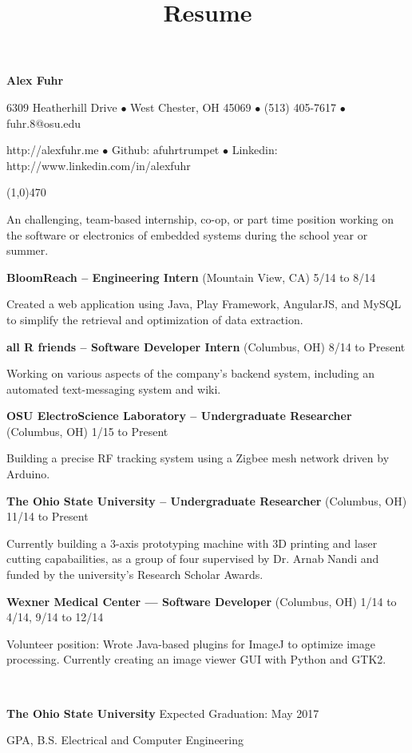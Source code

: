 \documentclass[10pt]{article}
\title{Resume}
\begin{document}
\centerline{{\LARGE \bf Alex Fuhr}}
\centerline{6309 Heatherhill Drive $\bullet$ West Chester, OH 45069 $\bullet$ (513) 405-7617 $\bullet$ fuhr.8@osu.edu}
\centerline{http://alexfuhr.me $\bullet$ Github: afuhrtrumpet $\bullet$ Linkedin: http://www.linkedin.com/in/alexfuhr}
\noindent
\line(1,0){470}\\

\smallskip

\noindent
An challenging, team-based internship, co-op, or part time position working on the software or electronics of embedded systems during the school year or summer.
\medskip

\smallskip

\centerline{{\large {\bf BloomReach -- Engineering Intern} (Mountain View, CA) \hfill 5/14 to 8/14}}
\noindent
Created a web application using Java, Play Framework, AngularJS, and MySQL to simplify the retrieval and optimization of data extraction.

\smallskip
\centerline{{\large {\bf all R friends -- Software Developer Intern} (Columbus, OH) \hfill 8/14 to Present}}
\noindent
Working on various aspects of the company's backend system, including an automated text-messaging system and wiki.
\smallskip

\centerline{{\large {\bf OSU ElectroScience Laboratory -- Undergraduate Researcher} (Columbus, OH) \hfill 1/15 to Present}}
\noindent
Building a precise RF tracking system using a Zigbee mesh network driven by Arduino.
\smallskip

\centerline{{\large {\bf The Ohio State University -- Undergraduate Researcher} (Columbus, OH) \hfill 11/14 to Present}}
\noindent
Currently building a 3-axis prototyping machine with 3D printing and laser cutting capabailities, as a group of four supervised by Dr. Arnab Nandi and funded by the university's Research Scholar Awards.
\smallskip

\centerline{{\large {\bf Wexner Medical Center --- Software Developer} (Columbus, OH) \hfill 1/14 to 4/14, 9/14 to 12/14}}
\noindent
Volunteer position: Wrote Java-based plugins for ImageJ to optimize image processing. Currently creating an image viewer GUI with Python and GTK2.
\medskip

\\
\smallskip
\centerline{{\large {\bf The Ohio State University} \hfill Expected Graduation: May 2017}}
 GPA, B.S. Electrical and Computer Engineering
\medskip
\end{document}

